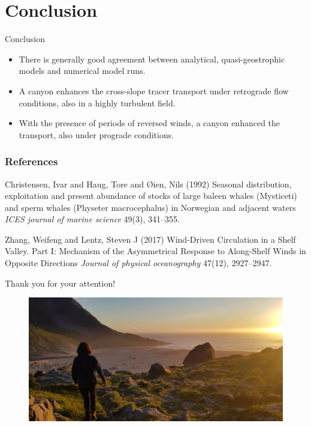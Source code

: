 \documentclass{beamer}
\begin{document}
\section{Conclusion}
\begin{frame}{Conclusion}
\begin{itemize}
    \item There is generally good agreement between analytical, quasi-geostrophic models and numerical model runs.
    \item A canyon enhances the cross-slope tracer transport under retrograde flow conditions, also in a highly turbulent field.
    \item With the presence of periods of reversed winds, a canyon enhanced the transport, also under prograde conditions.
\end{itemize} 
\end{frame}





\begin{frame}
\frametitle{References}
\footnotesize{
\begin{thebibliography}{99} %
 Christensen, Ivar and Haug, Tore and Øien, Nils (1992)
\newblock Seasonal distribution, exploitation and present abundance of stocks of large baleen whales (Mysticeti) and sperm whales (Physeter macrocephalus) in Norwegian and adjacent waters
\newblock \emph{ICES journal of marine science} 49(3), 341--355.

 Zhang, Weifeng  and Lentz, Steven J (2017)
\newblock Wind-Driven Circulation in a Shelf Valley. Part I: Mechanism of the Asymmetrical Response to Along-Shelf Winds in Opposite Directions
\newblock \emph{Journal of physical oceanography} 47(12), 2927--2947.
\end{thebibliography}
}
\end{frame}


\begin{frame}
\Huge{Thank you for your attention!}
\begin{figure}
\centering
\includegraphics[width=\textwidth]{figures/meg.jpeg}
\end{figure}
\end{frame}
\end{document}
